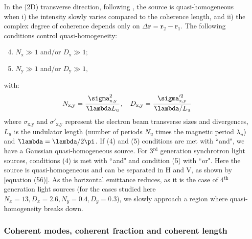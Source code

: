 \documentclass{iucr}              %
\newcommand{\lambdabar}{{\mkern0.75mu\mathchar '26\mkern -8.2mu\lambda}}
\begin{document}
In the (2D) transverse direction, following \cite{geloni2008}, the source is quasi-homogeneous  when i) the intensity slowly varies compared to the coherence length, and ii) the complex degree of coherence depends only on $\Delta\textbf{r}=\textbf{r}_2-\textbf{r}_1$. The following conditions control quasi-homogeneity: 
\begin{enumerate}%
\setcounter{enumi}{3}
\item $N_\text{x}\gg1$ and/or $D_\text{x}\gg1$;
\item $N_\text{y}\gg1$ and/or $D_\text{y}\gg1$,
\end{enumerate}
with:
\begin{equation}
    N_\text{x,y}=\frac{\sigma^2_\text{x,y}}{\lambdabar L_u}, \quad D_\text{x,y}=\frac{\sigma'^2_\text{x,y}}{\lambdabar/L_u}
\end{equation}
where $\sigma_\text{x,y}$ and $\sigma'_\text{x,y}$ represent the electron beam transverse sizes and divergences, $L_u$ is the undulator length (number of periods $N_u$ times the magnetic period $\lambda_u$) and $\lambdabar=\lambda/2\pi$.
If (4) and (5) conditions are met with ``and", we have a Gaussian quasi-homogeneous source.  For 3$^{\text{rd}}$ generation synchrotron light sources, conditions (4) is met with ``and" and condition (5) with ``or". Here the source is quasi-homogeneous and can be separated in H and V, as shown by  [equation (56)]. 
As the horizontal emittance reduces, as it is the case of 4$^{\text{th}}$ generation light sources (for the cases studied here $N_x=13, D_x=2.6, N_y=0.4, D_y=0.3$), we slowly approach a region where quasi-homogeneity breaks down.

\subsubsection{Coherent modes, coherent fraction and coherent length\\}
\end{document}
